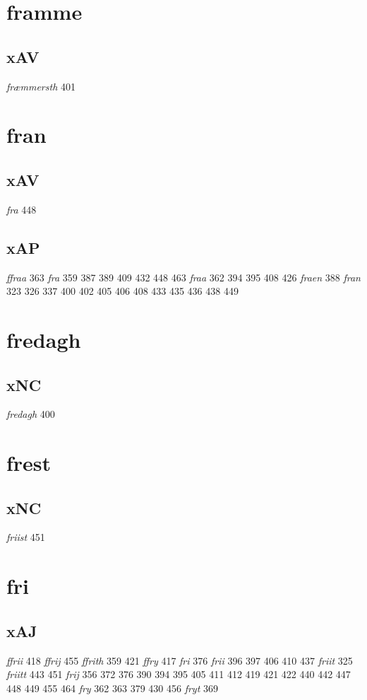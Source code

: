 \documentclass[a4paper,twocolumn]{article}
\begin{document}
\section{framme}
\label{sec:org49f15f0}
\subsection{xAV}
\label{sec:org77829a9}
\emph{fræmmersth} 401 
\section{fran}
\label{sec:orgd5f514f}
\subsection{xAV}
\label{sec:org073a114}
\emph{fra} 448 
\subsection{xAP}
\label{sec:orgcb05903}
\emph{ffraa} 363 \emph{fra} 359 387 389 409 432 448 463 \emph{fraa} 362 394 395 408 426 \emph{fraen} 388 \emph{fran} 323 326 337 400 402 405 406 408 433 435 436 438 449 
\section{fredagh}
\label{sec:org7f043b7}
\subsection{xNC}
\label{sec:org3bfa9d4}
\emph{fredagh} 400 
\section{frest}
\label{sec:org54606c8}
\subsection{xNC}
\label{sec:orgd411e98}
\emph{friist} 451 
\section{fri}
\label{sec:org6dbb83f}
\subsection{xAJ}
\label{sec:orga6b62e9}
\emph{ffrii} 418 \emph{ffrij} 455 \emph{ffrith} 359 421 \emph{ffry} 417 \emph{fri} 376 \emph{frii} 396 397 406 410 437 \emph{friit} 325 \emph{friitt} 443 451 \emph{frij} 356 372 376 390 394 395 405 411 412 419 421 422 440 442 447 448 449 455 464 \emph{fry} 362 363 379 430 456 \emph{fryt} 369 
\end{document}
